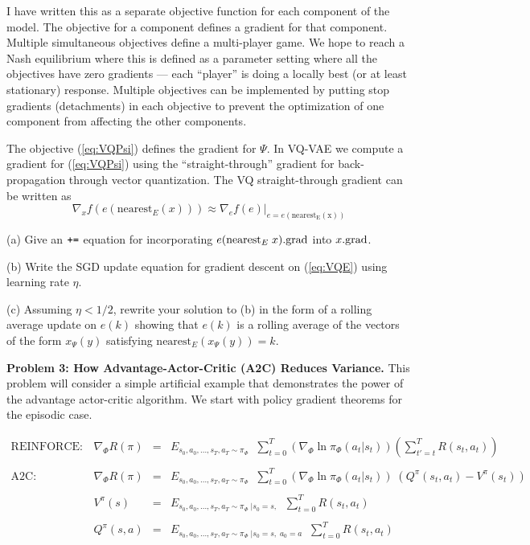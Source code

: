I have written this as a separate objective function for each component of the model.  The objective for a component defines a gradient for that component.
Multiple simultaneous objectives define a multi-player game.  We hope to reach a Nash equilibrium where this is defined as a parameter setting
where all the objectives have zero gradients --- each ``player'' is doing a locally best (or at least stationary) response.
Multiple objectives can be implemented by putting stop gradients (detachments) in each objective to prevent the optimization of one component from affecting the other
components.

\medskip
The objective (\ref{eq:VQPsi}) defines the gradient for $\Psi$.
In VQ-VAE we compute a gradient for (\ref{eq:VQPsi}) using the ``straight-through'' gradient for back-propagation through vector quantization.
The VQ straight-through gradient can be written as
$$\nabla_x f(e(\mathrm{nearest}_E(x))) \approx \nabla_e f(e)|_{e = e(\mathrm{nearest_E(x)})}$$

\medskip
(a) Give an $\mbox{\tt +=}$ equation for incorporating $e(\mathrm{nearest}_E\;x).\mathrm{grad}$ into $x.\mathrm{grad}$.


\medskip
(b) Write the SGD update equation for gradient descent on (\ref{eq:VQE}) using learning rate $\eta$.


\medskip
(c) Assuming $\eta < 1/2$, rewrite your solution to (b) in the form of a rolling average update on $e(k)$ showing that $e(k)$ is a rolling average
of the vectors of the form $x_\Psi(y)$ satisfying $\mathrm{nearest}_E(x_\Psi(y)) = k$.


\bigskip

{\bf Problem 3: How Advantage-Actor-Critic (A2C) Reduces Variance.}  This problem will consider a simple artificial example that demonstrates the power of the advantage actor-critic algorithm.
We start with policy gradient theorems for the episodic case.

$$\begin{array}{lrcl}
  \mathrm{REINFORCE:} &\nabla_\Phi R(\pi) & =  &E_{s_0,a_0,\ldots,s_T,a_T \sim \pi_\Phi}\;\;\sum_{t=0}^T (\nabla_\Phi \ln \pi_\Phi(a_t|s_t))\left(\sum_{t' = t}^T R(s_t,a_t)\right) \\
  \\
  \mathrm{A2C:} &\nabla_\Phi R(\pi) & =  &E_{s_0,a_0,\ldots,s_T,a_T \sim \pi_\Phi}\;\;\sum_{t=0}^T (\nabla_\Phi \ln \pi_\Phi(a_t|s_t))\;(Q^\pi(s_t,a_t) - V^\pi(s_t)) \\
  \\
  & V^\pi(s) & = & E_{s_0,a_0,\ldots,s_T,a_T \sim \pi_\Phi \;|s_0=s,}\;\;\sum_{t=0}^T R(s_t,a_t) \\
  \\
  & Q^\pi(s,a) & = & E_{s_0,a_0,\ldots,s_T,a_T \sim \pi_\Phi \;|s_0=s,\;a_0 = a}\;\;\sum_{t=0}^T R(s_t,a_t)
\end{array}$$

